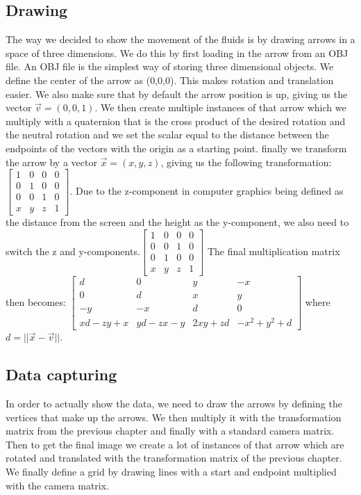 \documentclass{article}
\begin{document}
\subsection{Drawing}
The way we decided to show the movement of the fluids is by drawing arrows in a space of three dimensions. We do this by first loading in the arrow from an OBJ file. An OBJ file is the simplest way of storing three dimensional objects. We define the center of the arrow as (0,0,0). This makes rotation and translation easier. We also make sure that by default the arrow position is up, giving us the vector $\vec{v}=(0,0,1)$. We then create multiple instances of that arrow which we multiply with a quaternion that is the cross product of the desired rotation and the neutral rotation and we set the scalar equal to the distance between the endpoints of the vectors with the origin as a starting point. finally we transform the arrow by a vector $\vec{x}=(x,y,z)$, giving us the following transformation: 
$\begin{bmatrix}
1 & 0 & 0 & 0\\
0 & 1 & 0 & 0\\
0 & 0 & 1 & 0\\
x & y & z & 1
\end{bmatrix}$. Due to the z-component in computer graphics being defined as the distance from the screen and the height as the y-component, we also need to switch the z and y-components.$\begin{bmatrix}
1 & 0 & 0 & 0\\
0 & 0 & 1 & 0\\
0 & 1 & 0 & 0\\
x & y & z & 1
\end{bmatrix}$
The final multiplication matrix then becomes: 
$\begin{bmatrix}

d & 0 & y & -x\\
0 & d & x & y\\
-y & -x & d & 0\\
xd-zy+x & yd -zx - y & 2xy + zd & -x^2 + y^2 + d 

\end{bmatrix}$
where $d = ||\vec{x}-\vec{v}||$.\cite{Quaternion rotation}
\subsection{Data capturing}
In order to actually show the data, we need to draw the arrows by defining the vertices that make up the arrows. We then multiply it with the transformation matrix from the previous chapter and finally with a standard camera matrix. \cite{mvp} Then to get the final image we create a lot of instances of that arrow which are rotated and translated with the transformation matrix of the previous chapter. \label{Drawing} We finally define a grid by drawing lines with a start and endpoint multiplied with the camera matrix.
\end{document}
